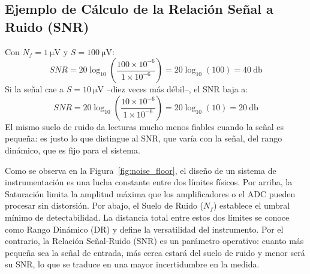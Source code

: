 \subsection{Ejemplo de Cálculo de la Relación Señal a Ruido (SNR)}\label{sec:ejemplo_snr}

Con $N_f = \SI{1}{\micro\volt}$ y $S = \SI{100}{\micro\volt}$:
\begin{equation}
    SNR = 20 \log_{10} \left( \frac{100 \times 10^{-6}}{1 \times 10^{-6}} \right) = 20 \log_{10} (100) = \SI{40}{\decibel}
\end{equation}
Si la señal cae a $S = \SI{10}{\micro\volt}$ --diez veces más débil--, el SNR baja a:
\begin{equation}
    SNR = 20 \log_{10} \left( \frac{10 \times 10^{-6}}{1 \times 10^{-6}} \right) = 20 \log_{10} (10) = \SI{20}{\decibel}
\end{equation}
El mismo suelo de ruido da lecturas mucho menos fiables cuando la señal es pequeña: es justo lo que distingue al SNR, que varía con la señal, del rango dinámico, que es fijo para el sistema.

Como se observa en la Figura~\ref{fig:noise_floor}, el diseño de un sistema de instrumentación es una lucha constante entre dos límites físicos. Por arriba, la Saturación limita la amplitud máxima que los amplificadores o el ADC pueden procesar sin distorsión. Por abajo, el Suelo de Ruido ($N_f$) establece el umbral mínimo de detectabilidad. La distancia total entre estos dos límites se conoce como Rango Dinámico (DR) y define la versatilidad del instrumento. Por el contrario, la Relación Señal-Ruido (SNR) es un parámetro operativo: cuanto más pequeña sea la señal de entrada, más cerca estará del suelo de ruido y menor será su SNR, lo que se traduce en una mayor incertidumbre en la medida.

